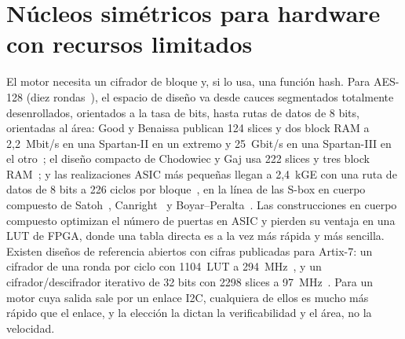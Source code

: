 \section{Núcleos simétricos para hardware con recursos limitados}
\label{sec:soa_cores}

El motor necesita un cifrador de bloque y, si lo usa, una función hash.
Para AES-128 (diez rondas~\cite{nist_2023_fips197}), el espacio de diseño
va desde cauces segmentados totalmente desenrollados, orientados a la
tasa de bits, hasta rutas de datos de 8 bits, orientadas al área: Good y
Benaissa publican 124 slices y dos block RAM a 2,2~Mbit/s en una
Spartan-II en un extremo y 25~Gbit/s en una Spartan-III en el
otro~\cite{good_2005_fastest}; el diseño compacto de Chodowiec y Gaj usa
222 slices y tres block RAM~\cite{chodowiec_2003_compact}; y las
realizaciones ASIC más pequeñas llegan a 2,4~kGE con una ruta de datos de
8 bits a 226 ciclos por bloque~\cite{moradi2011pushing}, en la línea de
las S-box en cuerpo compuesto de Satoh~\cite{satoh_2001_compact},
Canright~\cite{canright_2005_compact} y
Boyar--Peralta~\cite{boyar_2010_minimization}. Las construcciones en
cuerpo compuesto optimizan el número de puertas en ASIC y pierden su
ventaja en una LUT de FPGA, donde una tabla directa es a la vez más
rápida y más sencilla. Existen diseños de referencia abiertos con cifras
publicadas para Artix-7: un cifrador de una ronda por ciclo con 1104~LUT
a 294~MHz~\cite{hadipour_aesvhdl}, y un cifrador/descifrador iterativo de
32 bits con 2298 slices a 97~MHz~\cite{strombergson_aes}. Para un motor
cuya salida sale por un enlace I2C, cualquiera de ellos es mucho más
rápido que el enlace, y la elección la dictan la verificabilidad y el
área, no la velocidad.

